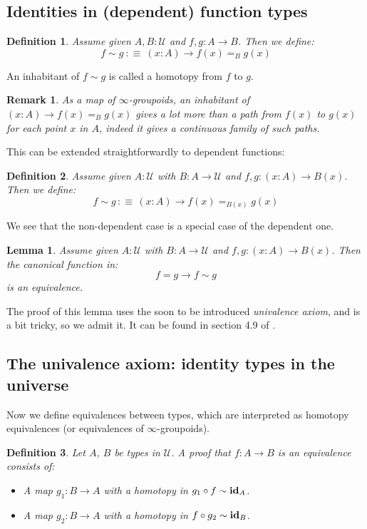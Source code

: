 \documentclass{article}
\newcommand{\sse}[1]{\medbreak \subsection{#1}}
\newcommand{\U}{{\mathcal U}}
\renewcommand{\r}{\rightarrow}
\newcommand{\id}{\mathrm{\bf id}}
\newtheorem{lemma}{Lemma}
\newtheorem{definition}{Definition}
\newtheorem{remark}{Remark}
\begin{document}
\sse{Identities in (dependent) function types}

\begin{definition}
Assume given $A,B:\U$ and $f,g:A\r B$. Then we define:
\[f\sim g \ :\equiv\ (x:A)\r f(x) =_B g(x)\]
\end{definition}

An inhabitant of $f\sim g$ is called a homotopy from $f$ to $g$. 

\begin{remark}
As a map of $\infty$-groupoids, an inhabitant of $(x:A)\r f(x)=_B g(x)$ gives a lot more than a path from $f(x)$ to $g(x)$ for each point $x$ in $A$, indeed it gives a continuous family of such paths.%
\end{remark}

This can be extended straightforwardly to dependent functions:

\begin{definition}
Assume given $A:\U$ with $B:A\r \U$ and $f,g:(x:A)\r B(x)$. Then we define:
\[f\sim g \, :\equiv\, (x:A)\r f(x) =_{B(x)} g(x)\]
\end{definition}

We see that the non-dependent case is a special case of the dependent one.

\begin{lemma}
Assume given $A:\U$ with $B:A\r \U$ and $f,g:(x:A)\r B(x)$. Then the canonical function in:
\[f= g \r f\sim g\]
is an equivalence.
\end{lemma}


The proof of this lemma uses the soon to be introduced \emph{univalence axiom}, and is a bit tricky, so we admit it. It can be found in section 4.9 of \cite{hottbook}.



\sse{The univalence axiom: identity types in the universe}

Now we define equivalences between types, which are interpreted as homotopy equivalences (or equivalences of $\infty$-groupoids).

\begin{definition}
Let $A$, $B$ be types in $\U$. A proof that $f:A\r B$ is an equivalence consists of:
\begin{itemize}
\item A map $g_1:B\r A$ with a homotopy in $g_1\circ f \sim \id_A$.
\item A map $g_2:B\r A$ with a homotopy in $f\circ g_2 \sim \id_B$.
\end{itemize}
\end{definition}
\end{document}
